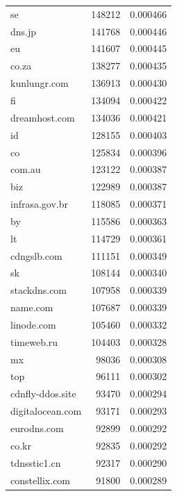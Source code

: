 \begin{tabular}{lrr}
se & 148212 & 0.000466 \\
dns.jp & 141768 & 0.000446 \\
eu & 141607 & 0.000445 \\
co.za & 138277 & 0.000435 \\
kunlungr.com & 136913 & 0.000430 \\
fi & 134094 & 0.000422 \\
dreamhost.com & 134036 & 0.000421 \\
id & 128155 & 0.000403 \\
co & 125834 & 0.000396 \\
com.au & 123122 & 0.000387 \\
biz & 122989 & 0.000387 \\
infrasa.gov.br & 118085 & 0.000371 \\
by & 115586 & 0.000363 \\
lt & 114729 & 0.000361 \\
cdngslb.com & 111151 & 0.000349 \\
sk & 108144 & 0.000340 \\
stackdns.com & 107958 & 0.000339 \\
name.com & 107687 & 0.000339 \\
linode.com & 105460 & 0.000332 \\
timeweb.ru & 104403 & 0.000328 \\
mx & 98036 & 0.000308 \\
top & 96111 & 0.000302 \\
cdnfly-ddos.site & 93470 & 0.000294 \\
digitalocean.com & 93171 & 0.000293 \\
eurodns.com & 92899 & 0.000292 \\
co.kr & 92835 & 0.000292 \\
tdnsstic1.cn & 92317 & 0.000290 \\
constellix.com & 91800 & 0.000289 \\
\bottomrule
\end{tabular}
